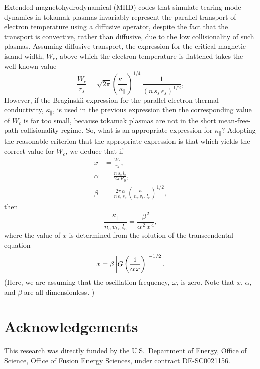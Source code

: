 \documentclass[12pt,prb,aps]{revtex4-1}
\begin{document}
 Extended magnetohydrodynamical  (MHD) codes that simulate tearing mode dynamics in tokamak plasmas invariably represent the parallel transport of electron temperature using a diffusive operator, despite the
 fact that the transport is convective, rather than diffusive, due to the low collisionality of such plasmas. Assuming diffusive transport, the expression for the critical magnetic island width, $W_c$,  above which the electron temperature is flattened takes the well-known value\,\cite{rf}
\begin{equation}\label{e1w}
  \frac{W_{c}}{r_s} =
\sqrt{2\pi}\left(\frac{\kappa_\perp}{\kappa_{\parallel}}\right)^{1/4}\,\frac{1}{(n\,s_s\,\epsilon_s)^{1/2}},
\end{equation}
However, if the  Braginskii expression for the parallel electron thermal conductivity,\cite{brag} $\kappa_\parallel$, is used in the previous expression then the corresponding value of
$W_c$ is far too small, because tokamak plasmas are not in the short mean-free-path collisionality regime. So, what is an appropriate expression for 
$\kappa_\parallel$? Adopting the reasonable criterion that the appropriate expression is that which yields the correct value for $W_c$, 
 we deduce that if 
 \begin{align}
 x &= \frac{W_c}{r_s},\\[0.5ex]
 \alpha &=\frac{n\,s_s\,l_e}{2\pi\,R_0},\\[0.5ex]
 \beta &= \frac{2\pi\,\alpha}{n\,\epsilon_s\,s_s}\left(\frac{\kappa_\perp}{n_e\,v_{t\,e}\,l_e}\right)^{1/2},
 \end{align}
 then 
\begin{equation}
\frac{\kappa_\parallel}{n_e\,v_{t\,e}\,l_e}= \frac{\beta^{\,2}}{\alpha^{\,2}\,x^{\,4}},
\end{equation}
where the  value of $x$ is determined from the solution of the transcendental equation
\begin{equation}
x = \beta\left|G\left(\frac{\rm i}{\alpha\,x}\right)\right|^{-1/2}.
\end{equation}
(Here, we are assuming that the oscillation frequency, $\omega$, is zero. Note that $x$, $\alpha$, and $\beta$ are all dimensionless. )
 
\section*{Acknowledgements}
This research was directly funded by the U.S.\ Department of Energy, Office of Science, Office of Fusion Energy Sciences, under  contract DE-SC0021156. 
\end{document}
